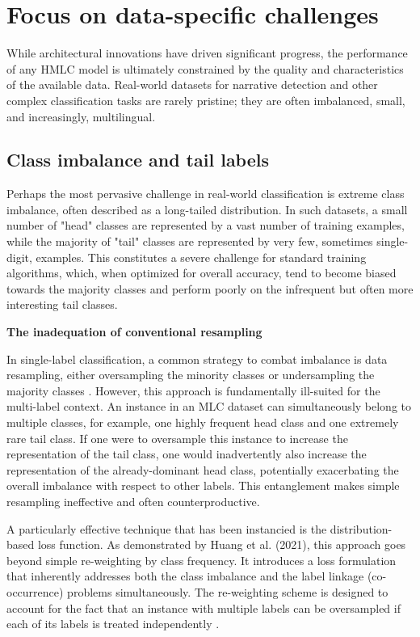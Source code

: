 \section{Focus on data-specific challenges}
While architectural innovations have driven significant progress, the performance of any HMLC model is ultimately constrained by the quality and characteristics of the available data. Real-world datasets for narrative detection and other complex classification tasks are rarely pristine; they are often imbalanced, small, and increasingly, multilingual.

\subsection{Class imbalance and tail labels}
Perhaps the most pervasive challenge in real-world classification is extreme class imbalance, often described as a long-tailed distribution. In such datasets, a small number of "head" classes are represented by a vast number of training examples, while the majority of "tail" classes are represented by very few, sometimes single-digit, examples. \cite{huang-etal-2021-balancing} This constitutes a severe challenge for standard training algorithms, which, when optimized for overall accuracy, tend to become biased towards the majority classes and perform poorly on the infrequent but often more interesting tail classes.


\textbf{The inadequation of conventional resampling}

In single-label classification, a common strategy to combat imbalance is data resampling, either oversampling the minority classes or undersampling the majority classes \cite{Luque2019The,Thabtah2020Data}. However, this approach is fundamentally ill-suited for the multi-label context. An instance in an MLC dataset can simultaneously belong to multiple classes, for example, one highly frequent head class and one extremely rare tail class. If one were to oversample this instance to increase the representation of the tail class, one would inadvertently also increase the representation of the already-dominant head class, potentially exacerbating the overall imbalance with respect to other labels. This entanglement makes simple resampling ineffective and often counterproductive. \cite{yuan2024research}


A particularly effective technique that has been instancied is the distribution-based loss function. As demonstrated by Huang et al. (2021), this approach goes beyond simple re-weighting by class frequency. It introduces a loss formulation that inherently addresses both the class imbalance and the label linkage (co-occurrence) problems simultaneously. The re-weighting scheme is designed to account for the fact that an instance with multiple labels can be oversampled if each of its labels is treated independently \cite{huang-etal-2021-balancing}.

